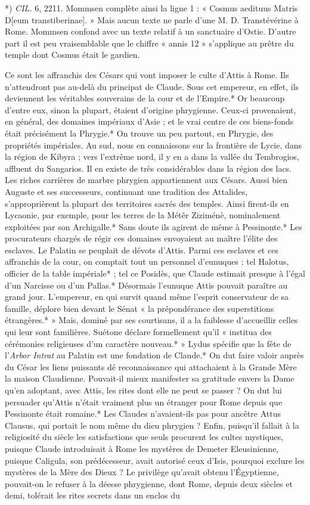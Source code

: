 \documentclass[a4paper, 11pt, oneside, polutonikogreek, french]{article}
\begin{document}
*) \emph{CIL.} 6, 2211. Mommsen complète ainsi la ligne 1 : « Cosmus aedituus Matris D[eum transtiberinae]. » Mais aucun texte ne parle d'une M. D. Transtévérine à Rome. Mommsen confond avec un texte relatif à un sanctuaire d'Ostie. D'autre part il est peu vraisemblable que le chiffre « annis 12 » s'applique au prêtre du temple dont Cosmus était le gardien.

Ce sont les affranchis des Césars qui vont imposer le culte d'Attis à Rome. Ils n'attendront pas au-delà du principat de Claude. Sous cet empereur, en effet, ils deviennent les véritables souverains de la cour et de l'Empire.* Or beaucoup d'entre eux, sinon la plupart, étaient d'origine phrygienne. Ceux-ci provenaient, en général, des domaines impériaux d'Asie ; et le vrai centre de ces biens-fonds était précisément la Phrygie.* On trouve un peu partout, en Phrygie, des propriétés impériales. Au sud, nous en connaissons sur la frontière de Lycie, dans la région de Kibyra ; vers l'extrême nord, il y en a dans la vallée du Tembrogios, affluent du Sangarios. Il en existe de très considérables dans la région des lacs. Les riches carrières de marbre phrygien appartiennent aux Césars. Aussi bien Auguste et ses successeurs, continuant une tradition des Attalides, s'approprièrent la plupart des territoires sacrés des temples. Ainsi firent-ils en Lycaonie, par exemple, pour les terres de la Métêr Ziziménè, nominalement exploitées par son Archigalle.* Sans doute ils agirent de même à Pessinonte.* Les procurateurs chargés de régir ces domaines envoyaient au maître l'élite des esclaves. Le Palatin se peuplait de dévots d'Attis. Parmi ces esclaves et ces affranchis de la cour, on comptait tout un personnel d'eunuques ; tel Halotus, officier de la table impériale* ; tel ce Posidès, que Claude estimait presque à l'égal d'un Narcisse ou d'un Pallas.* Désormais l'eunuque Attis pouvait paraître au grand jour. L'empereur, en qui survit quand même l'esprit conservateur de sa famille, déplore bien devant le Sénat « la prépondérance des superstitions étrangères.* » Mais, dominé par ses courtisans, il a la faiblesse d'accueillir celles qui leur sont familières. Suétone déclare formellement qu'il « institua des cérémonies religieuses d'un caractère nouveau.* » Lydus spécifie que la fête de l'\emph{Arbor Intrat} au Palatin est une fondation de Claude.* On dut faire valoir auprès du César les liens puissants dé reconnaissance qui attachaient à la Grande Mère la maison Claudienne. Pouvait-il mieux manifester sa gratitude envers la Dame qu'en adoptant, avec Attis, les rites dont elle ne peut se passer ? On dut lui persuader qu'Attis n'était vraiment plus un étranger pour Rome depuis que Pessinonte était romaine.* Les Claudes n'avaient-ils pas pour ancêtre Attus Clausus, qui portait le nom même du dieu phrygien ? Enfin, puisqu'il fallait à la religiosité du siècle les satisfactions que seuls procurent les cultes mystiques, puisque Claude introduisait à Rome les mystères de Demeter Eleusinienne, puisque Caligula, son prédécesseur, avait autorisé ceux d'Isis, pourquoi exclure les mystères de la Mère des Dieux ? Le privilège qu'avait obtenu l'Égyptienne, pouvait-on le refuser à la déesse phrygienne, dont Rome, depuis deux siècles et demi, tolérait les rites secrets dans un enclos du 
\end{document}
